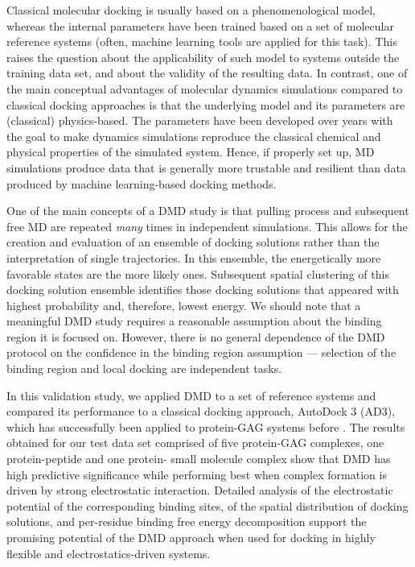 Classical molecular docking is usually based on a phenomenological model,
whereas the internal parameters have been trained based on a set of molecular
reference systems (often, machine learning tools are applied for this task).
This raises the question about the applicability of such model to systems
outside the training data set, and about the validity of the resulting data. In
contrast, one of the main conceptual advantages of molecular dynamics
simulations compared to classical docking approaches is that the underlying
model and its parameters are (classical) physics-based. The parameters have been
developed over years with the goal to make dynamics simulations reproduce the
classical chemical and physical properties of the simulated system. Hence, if
properly set up, MD simulations produce data that is generally more trustable
and resilient than data produced by machine learning-based docking methods.

One of the main concepts of a DMD study is that pulling process and subsequent
free MD are repeated \textit{many} times in independent simulations. This allows
for the creation and evaluation of an ensemble of docking solutions rather than
the interpretation of single trajectories. In this ensemble, the energetically
more favorable states are the more likely ones. Subsequent spatial clustering of
this docking solution ensemble identifies those docking solutions that appeared
with highest probability and, therefore, lowest energy. We should note that a
meaningful DMD study requires a reasonable assumption about the binding region
it is focused on. However, there is no general dependence of the DMD protocol on
the confidence in the binding region assumption --- selection of the binding
region and local docking are independent tasks.

In this validation study, we applied DMD to a set of reference systems and
compared its performance to a classical docking approach, AutoDock 3 (AD3),
which has successfully been applied to protein-GAG systems before
\cite{japan_docking_ad3_clustering, samsonov_docking_2011,%
pichert_characterization_2012}. The results obtained for our test data set
comprised of five protein-GAG complexes, one protein-peptide and one protein-
small molecule complex show that DMD has high predictive significance while
performing best when complex formation is driven by strong electrostatic
interaction. Detailed analysis of the electrostatic potential of the
corresponding binding sites, of the spatial distribution of docking solutions,
and per-residue binding free energy decomposition support the promising
potential of the DMD approach when used for docking in highly flexible and
electrostatics-driven systems.

